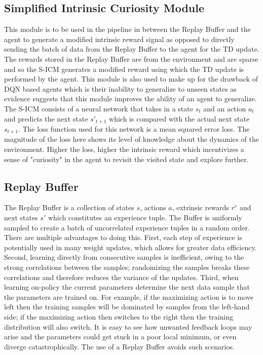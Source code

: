 \documentclass[12pt,a4paper]{article}
\begin{document}
\subsection{Simplified Intrinsic Curiosity Module}
This module is to be used in the pipeline in between the Replay Buffer and the agent to generate
a modified intrinsic reward signal as opposed to directly sending the batch of data from the Replay Buffer
to the agent for the TD update. The rewards stored in the Replay Buffer are from the environment and are sparse
and so the S-ICM generates a modified reward using which the TD update is performed by the agent.
This module is also used to make up for the drawback of DQN based agents which is their inability to generalize
to unseen states as evidence suggests that this module improves the ability of an agent to generalize.
The S-ICM consists of a neural network that takes in a state $s_t$ and an action $a_t$ and predicts the next state $s'_{t+1}$
which is compared with the actual next state $s_{t+1}$. The loss function used for this network is a mean squared error loss. The magnitude of the loss here shows its level of knowledge about the dynamics of the environment. Higher the loss, higher the intrinsic reward which incentivizes a sense of "curiosity" in the agent to revisit the visited state and explore further.

\subsection{Replay Buffer}
The Replay Buffer is a collection of states $s$, actions $a$, extrinsic rewards $r^e$ and next states $s'$ which constitutes an experience tuple. The Buffer is uniformly sampled to create a batch of uncorrelated experience tuples in a random order. There are multiple advantages
to doing this. First, each step of experience is potentially used in many weight 
updates, which allows for greater data efficiency. Second, learning directly from
consecutive samples is inefficient, owing to the strong correlations between the 
samples; randomizing the samples breaks these correlations and therefore reduces 
the variance of the updates. Third, when learning on-policy the current parameters 
determine the next data sample that the parameters are trained on. For example, if the
maximizing action is to move left then the training samples will be dominated by
samples from the left-hand side; if the maximizing action then switches to the 
right then the training distribution will also switch. 
It is easy to see how unwanted feedback loops may arise and the parameters could
get stuck in a poor local minimum, or even diverge catastrophically. The use of a Replay
Buffer avoids such scenarios.
\end{document}

